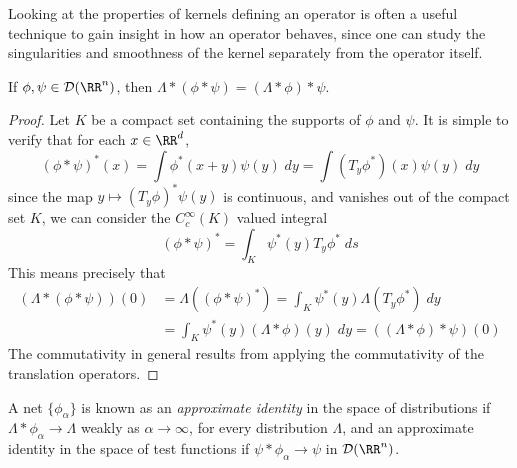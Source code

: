 Looking at the properties of kernels defining an operator is often a useful technique to gain insight in how an operator behaves, since one can study the singularities and smoothness of the kernel separately from the operator itself.

\begin{theorem}
    If $\phi, \psi \in \mathcal{D}(\RR^n)$, then $\Lambda * (\phi * \psi) = (\Lambda * \phi) * \psi$.
\end{theorem}
\begin{proof}
  Let $K$ be a compact set containing the supports of $\phi$ and $\psi$. It is simple to verify that for each $x \in \RR^d$,
    \[ (\phi * \psi)^*(x) = \int \phi^*(x + y) \psi(y)\; dy = \int (T_y \phi^*)(x) \psi(y)\; dy \]
    since the map $y \mapsto (T_y \phi)^* \psi(y)$ is continuous, and vanishes out of the compact set $K$, we can consider the $C_c^\infty(K)$ valued integral
    \[ (\phi * \psi)^* = \int_K \psi^*(y) T_y \phi^*\; ds \]
    This means precisely that
    \begin{align*}
        (\Lambda * (\phi * \psi))(0) &= \Lambda((\phi * \psi)^*) = \int_K \psi^*(y) \Lambda(T_y \phi^*)\; dy\\
        &= \int_K \psi^*(y) (\Lambda * \phi)(y)\; dy = ((\Lambda * \phi) * \psi)(0)
    \end{align*}
    The commutativity in general results from applying the commutativity of the translation operators.
\end{proof}

A net $\{ \phi_\alpha \}$ is known as an {\it approximate identity} in the space of distributions if $\Lambda * \phi_\alpha \to \Lambda$ weakly as $\alpha \to \infty$, for every distribution $\Lambda$, and an approximate identity in the space of test functions if $\psi * \phi_\alpha \to \psi$ in $\mathcal{D}(\RR^n)$.

